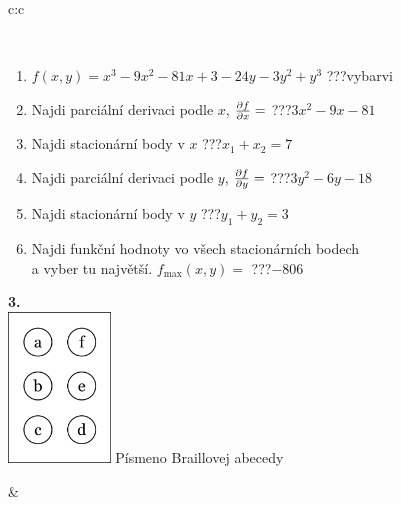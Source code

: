 \documentclass[10pt]{report}
\begin{document}
\begin{tabular}{c:c}
\begin{minipage}[c][104.5mm][t]{0.5\linewidth}
\begin{center}
\begin{minipage}{0.95\linewidth}
\begin{center}
\end{center}
\end{minipage}
\\[1mm]
\begin{minipage}{0.79\linewidth}
\begin{center}
\begin{varwidth}{\linewidth}
\begin{enumerate}
\normalsize
\item $f(x,y)=x^3-9x^2-81x+3-24y-3y^2+y^3$\quad \dotfill\; ???\;\dotfill \quad vybarvi
\item Najdi parciální derivaci podle $x$, $\pdv{f}{x}=$\quad \dotfill\; ???\;\dotfill \quad $3x^2-9x-81$
\item Najdi stacionární body v $x$\quad \dotfill\; ???\;\dotfill \quad $x_1+x_2=7$
\item Najdi parciální derivaci podle $y$, $\pdv{f}{y}=$\quad \dotfill\; ???\;\dotfill \quad $3y^2-6y-18$
\item Najdi stacionární body v $y$\quad \dotfill\; ???\;\dotfill \quad $y_1+y_2=3$
\item Najdi funkční hodnoty vo všech stacionárních bodech \\ \phantom{xxxxxx} a vyber tu najvětší. $f_{\text{max}}(x,y)=$\quad \dotfill\; ???\;\dotfill \quad $-806$
\end{enumerate}
\end{varwidth}
\end{center}
\end{minipage}
\begin{minipage}{0.20\linewidth}
\begin{center}
{\Huge\bfseries 3.} \\[2mm]
\includegraphics[height=40mm]{../images/braille.png}
{\small Písmeno Braillovej abecedy}
\end{center}
\end{minipage}
\end{center}
\end{minipage}
&
\begin{minipage}[c][104.5mm][t]{0.5\linewidth}
\begin{center}

\end{center}
\end{minipage}
\end{tabular}
\end{document}
